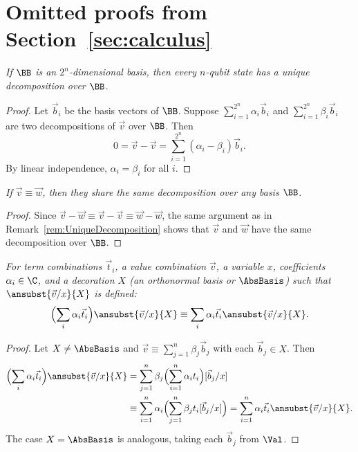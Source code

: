 
\section{Omitted proofs from Section~\ref{sec:calculus}}\label{sec:appendixA}

\begin{restateremark}
  \itshape
  If $\BB$ is an $2^n$-dimensional basis, then every $n$-qubit state has
  a unique decomposition over $\BB$.
\end{restateremark}
\begin{proof}
  Let $\vec{b}_{i}$ be the basis vectors of $\BB$. Suppose
  $\sum_{i=1}^{2^n} \alpha_i \vec{b}_{i}$ and $\sum_{i=1}^{2^n} \beta_i \vec{b}_{i}$
  are two decompositions of $\vec{v}$ over $\BB$. Then
  \[
    0=\vec{v}-\vec{v}=\sum_{i=1}^{2^n}(\alpha_i-\beta_i)\vec{b}_{i}.
  \]
  By linear independence, $\alpha_i=\beta_i$ for all $i$.
\end{proof}

\begin{restatecorollary}
  \itshape
  If $\vec{v}\equiv\vec{w}$, then they share the same decomposition over any
  basis $\BB$.
\end{restatecorollary}
\begin{proof}
  Since $\vec{v}-\vec{w}\equiv\vec{v}-\vec{v}\equiv\vec{w}-\vec{w}$, the same
  argument as in Remark~\ref{rem:UniqueDecomposition} shows that $\vec{v}$ and $\vec{w}$ have the same decomposition over $\BB$.
\end{proof}

\begin{restatelemma}
  \itshape
  For term combinations $\vec{t}_{i}$, a value combination $\vec{v}$, a
  variable $x$, coefficients $\alpha_i\in\C$, and a decoration $X$ (an
  orthonormal basis or $\AbsBasis$) such that $\ansubst{\vec v/x}{X}$ is defined:
  \[
    \Bigl(\sum_i \alpha_i\vec{t}_{i}\Bigr)\ansubst{\vec v/x}{X}
    \equiv
    \sum_i \alpha_i\vec{t}_{i} \ansubst{\vec v/x}{X}.
  \]
\end{restatelemma}
\begin{proof}
  Let $X\neq\AbsBasis$ and
  $\vec{v}\equiv\sum_{j=1}^n\beta_j\vec{b}_{j}$ with each $\vec{b}_{j}\in X$.
  Then
  \begin{align*}
    \Bigl(\sum_i \alpha_i\vec{t}_{i}\Bigr)\ansubst{\vec v/x}{X}
    &= \sum_{j=1}^n \beta_j\Bigl(\sum_{i=1}^{n}\alpha_i t_i\Bigr)[\vec{b}_{j}/x]\\
    &\equiv \sum_{i=1}^{n}\alpha_i\Bigl(\sum_{j=1}^n\beta_j t_i[\vec{b}_{j}/x]\Bigr)
    = \sum_{i=1}^{n}\alpha_i\vec{t}_{i}\ansubst{\vec v/x}{X}.
  \end{align*}
  The case $X=\AbsBasis$ is analogous, taking each $\vec{b}_j$ from $\Val$.
\end{proof}

